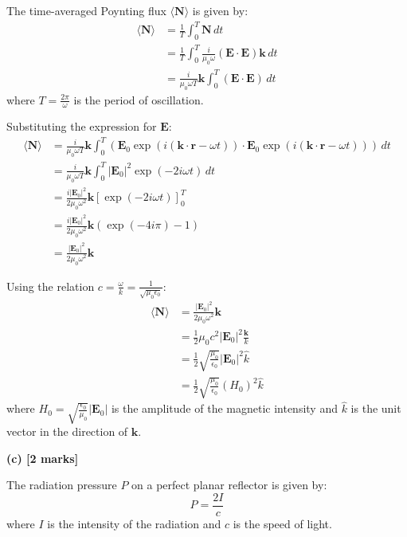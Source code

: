 \documentclass{article}
\begin{document}
The time-averaged Poynting flux $\langle \mathbf{N} \rangle$ is given by:
\begin{align*}
\langle \mathbf{N} \rangle &= \frac{1}{T} \int_0^T \mathbf{N} \, dt \\
&= \frac{1}{T} \int_0^T \frac{i}{\mu_0 \omega} (\mathbf{E} \cdot \mathbf{E}) \mathbf{k} \, dt \\
&= \frac{i}{\mu_0 \omega T} \mathbf{k} \int_0^T (\mathbf{E} \cdot \mathbf{E}) \, dt
\end{align*}
where $T = \frac{2\pi}{\omega}$ is the period of oscillation.

Substituting the expression for $\mathbf{E}$:
\begin{align*}
\langle \mathbf{N} \rangle &= \frac{i}{\mu_0 \omega T} \mathbf{k} \int_0^T (\mathbf{E}_0 \exp(i (\mathbf{k} \cdot \mathbf{r} - \omega t)) \cdot \mathbf{E}_0 \exp(i (\mathbf{k} \cdot \mathbf{r} - \omega t))) \, dt \\
&= \frac{i}{\mu_0 \omega T} \mathbf{k} \int_0^T |\mathbf{E}_0|^2 \exp(-2i \omega t) \, dt \\
&= \frac{i |\mathbf{E}_0|^2}{2 \mu_0 \omega^2} \mathbf{k} [\exp(-2i \omega t)]_0^T \\
&= \frac{i |\mathbf{E}_0|^2}{2 \mu_0 \omega^2} \mathbf{k} (\exp(-4i \pi) - 1) \\
&= \frac{|\mathbf{E}_0|^2}{2 \mu_0 \omega^2} \mathbf{k}
\end{align*}

Using the relation $c = \frac{\omega}{k} = \frac{1}{\sqrt{\mu_0 \epsilon_0}}$:
\begin{align*}
\langle \mathbf{N} \rangle &= \frac{|\mathbf{E}_0|^2}{2 \mu_0 \omega^2} \mathbf{k} \\
&= \frac{1}{2} \mu_0 c^2 |\mathbf{E}_0|^2 \frac{\mathbf{k}}{k} \\
&= \frac{1}{2} \sqrt{\frac{\mu_0}{\epsilon_0}} |\mathbf{E}_0|^2 \hat{k} \\
&= \frac{1}{2} \sqrt{\frac{\mu_0}{\epsilon_0}} (H_0)^2 \hat{k}
\end{align*}
where $H_0 = \sqrt{\frac{\epsilon_0}{\mu_0}} |\mathbf{E}_0|$ is the amplitude of the magnetic intensity and $\hat{k}$ is the unit vector in the direction of $\mathbf{k}$.

\textbf{(c) [2 marks]}

The radiation pressure $P$ on a perfect planar reflector is given by:
\begin{equation*}
P = \frac{2I}{c}
\end{equation*}
where $I$ is the intensity of the radiation and $c$ is the speed of light.
\end{document}
